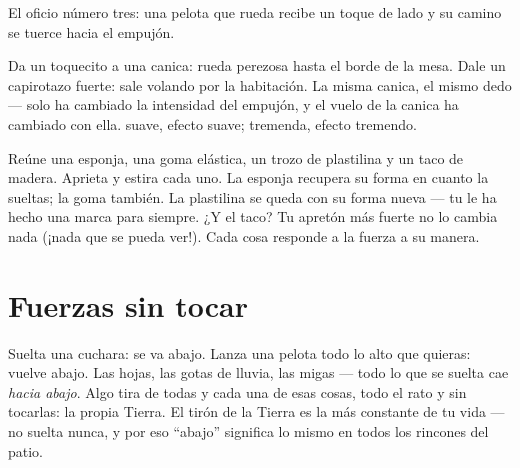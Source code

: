 \begin{omfigure}

{\small El oficio número tres: una pelota que rueda recibe un toque de
lado y su camino se tuerce hacia el empujón.}
\end{omfigure}

\begin{example}\label{ex:g2:pushes-and-pulls:stronger}
Da un toquecito a una canica: rueda perezosa hasta el borde de la
mesa. Dale un capirotazo fuerte: sale volando por la habitación. La
misma canica, el mismo dedo --- solo ha cambiado la intensidad del
empujón, y el vuelo de la canica ha cambiado con ella.  suave,
efecto suave;  tremenda, efecto tremendo.
\end{example}

\begin{example}\label{ex:g2:pushes-and-pulls:shape}
Reúne una esponja, una goma elástica, un trozo de plastilina y un
taco de madera. Aprieta y estira cada uno. La esponja recupera su
forma en cuanto la sueltas; la goma también. La plastilina se queda
con su forma nueva --- tu  le ha hecho una marca para siempre.
¿Y el taco? Tu apretón más fuerte no lo cambia nada (¡nada que se
pueda ver!). Cada cosa responde a la fuerza a su manera.
\end{example}

\section{Fuerzas sin tocar}

\begin{example}\label{ex:g2:pushes-and-pulls:earthpull}
Suelta una cuchara: se va abajo. Lanza una pelota todo lo alto que
quieras: vuelve abajo. Las hojas, las gotas de lluvia, las migas ---
todo lo que se suelta cae \emph{hacia abajo}. Algo tira de todas y
cada una de esas cosas, todo el rato y sin tocarlas: la propia Tierra.
El tirón de la Tierra es la  más constante de tu vida --- no
suelta nunca, y por eso ``abajo'' significa lo mismo en todos los
rincones del patio.
\end{example}


